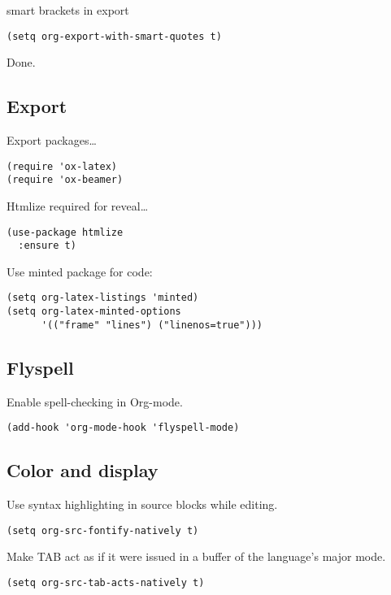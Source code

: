 \documentclass[12pt]{article}
\begin{document}
smart brackets in export

\begin{verbatim}
(setq org-export-with-smart-quotes t)
\end{verbatim}

Done.
\subsection{Export}
\label{sec:orgc9485bb}

Export packages\ldots{}

\begin{verbatim}
(require 'ox-latex)
(require 'ox-beamer)
\end{verbatim}

Htmlize required for reveal\ldots{}

\begin{verbatim}
(use-package htmlize
  :ensure t)
\end{verbatim}

Use minted package for code: 

\begin{verbatim}
(setq org-latex-listings 'minted)
(setq org-latex-minted-options
      '(("frame" "lines") ("linenos=true")))

\end{verbatim}

\subsection{Flyspell}
\label{sec:org90a861a}
Enable spell-checking in Org-mode.
\begin{verbatim}
(add-hook 'org-mode-hook 'flyspell-mode)
\end{verbatim}

\subsection{Color and display}
\label{sec:org1f3b81d}

Use syntax highlighting in source blocks while editing.
\begin{verbatim}
(setq org-src-fontify-natively t)
\end{verbatim}

Make TAB act as if it were issued in a buffer of the language’s major mode.
\begin{verbatim}
(setq org-src-tab-acts-natively t)
\end{verbatim}
\end{document}
